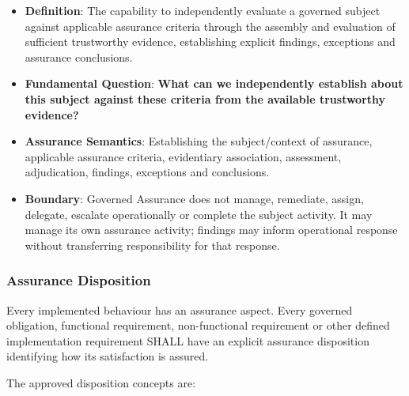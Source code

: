 \begin{itemize}

\item
\textbf{Definition}: The capability to independently evaluate a governed subject against applicable assurance criteria through the assembly and evaluation of sufficient trustworthy evidence, establishing explicit findings, exceptions and assurance conclusions.



\item
\textbf{Fundamental Question}: \textbf{What can we independently establish about this subject against these criteria from the available trustworthy evidence?}



\item
\textbf{Assurance Semantics}: Establishing the subject/\allowbreak{}context of assurance, applicable assurance criteria, evidentiary association, assessment, adjudication, findings, exceptions and conclusions.



\item
\textbf{Boundary}: Governed Assurance does not manage, remediate, assign, delegate, escalate operationally or complete the subject activity. It may manage its own assurance activity; findings may inform operational response without transferring responsibility for that response.



\end{itemize}
\label{rad:enabling:701}
\subsubsection*{Assurance Disposition}
\label{rad:enabling:703}

Every implemented behaviour has an assurance aspect. Every governed obligation, functional requirement, non-functional requirement or other defined implementation requirement SHALL have an explicit assurance disposition identifying how its satisfaction is assured.

\label{rad:enabling:705}

The approved disposition concepts are:

\label{rad:enabling:707}

